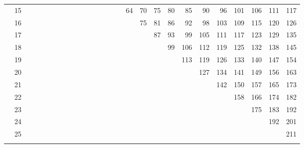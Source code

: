 \begin{table}[H]
{\begin{tabular}[t]{*{27}{r}}
 & 15 &  &  &  &  &  &  &  &  &  &  &  &  &  &  & 64 & 70 & 75 & 80 & 85 & 90 & 96 & 101 & 106 & 111 & 117\\
 & 16 &  &  &  &  &  &  &  &  &  &  &  &  &  &  &  & 75 & 81 & 86 & 92 & 98 & 103 & 109 & 115 & 120 & 126\\
 & 17 &  &  &  &  &  &  &  &  &  &  &  &  &  &  &  &  & 87 & 93 & 99 & 105 & 111 & 117 & 123 & 129 & 135\\
 & 18 &  &  &  &  &  &  &  &  &  &  &  &  &  &  &  &  &  & 99 & 106 & 112 & 119 & 125 & 132 & 138 & 145\\
 & 19 &  &  &  &  &  &  &  &  &  &  &  &  &  &  &  &  &  &  & 113 & 119 & 126 & 133 & 140 & 147 & 154\\
 & 20 &  &  &  &  &  &  &  &  &  &  &  &  &  &  &  &  &  &  &  & 127 & 134 & 141 & 149 & 156 & 163\\
 & 21 &  &  &  &  &  &  &  &  &  &  &  &  &  &  &  &  &  &  &  &  & 142 & 150 & 157 & 165 & 173\\
 & 22 &  &  &  &  &  &  &  &  &  &  &  &  &  &  &  &  &  &  &  &  &  & 158 & 166 & 174 & 182\\
 & 23 &  &  &  &  &  &  &  &  &  &  &  &  &  &  &  &  &  &  &  &  &  &  & 175 & 183 & 192\\
 & 24 &  &  &  &  &  &  &  &  &  &  &  &  &  &  &  &  &  &  &  &  &  &  &  & 192 & 201\\
 & 25 &  &  &  &  &  &  &  &  &  &  &  &  &  &  &  &  &  &  &  &  &  &  &  &  & 211\\
\lspbottomrule
\end{tabular}}
\end{table}

